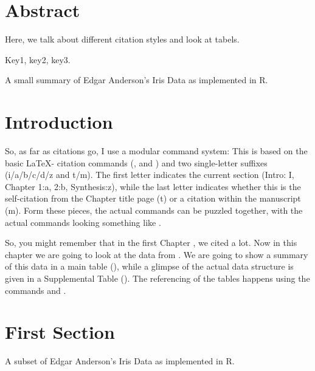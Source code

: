\section*{Abstract}
\noindent
Here, we talk about different citation styles and look at tabels.

 Key1, key2, key3.

\begin{multicols}{2}

\begin{table*}[!htb]
\centering
\caption[Summary of Anderson's Iris Data]{\label{tab:c2t1}
A small summary of Edgar Anderson's Iris Data as implemented in R.}
\begin{small}

\end{small}
\end{table*}

\section{Introduction}

So, as far as citations go, I use a modular command system: This is based on the basic \LaTeX - citation commands (,  and ) and two single-letter suffixes (i/a/b/c/d/z and t/m). The first letter indicates the current section (Intro: I, Chapter 1:a, 2:b, Synthesis:z), while the last letter indicates whether this is the self-citation from the Chapter title page (t) or a citation within the manuscript (m).
Form these pieces, the actual commands can be puzzled together, with the actual commands looking something like .

So, you might remember that in the first Chapter , we cited  a lot.
Now in this chapter we are going to look at the data from .
We are going to show a summary of this data in a main table (), while a glimpse of the actual data structure is given in a Supplemental Table ().
The referencing of the tables happens using the commands  and .

\section{First Section}
\lipsum[7-8]

\begin{supplTable*}[!t]
\centering
\captionsetup{width=.6\linewidth}
\caption[Subset of Anderson's Iris Data]{\label{tab:c2st1}
A subset of Edgar Anderson's Iris Data as implemented in R.}
\begin{small}

\end{small}
\end{supplTable*}


\end{multicols}
